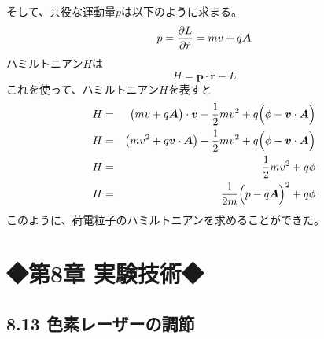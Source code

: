 \documentclass[11pt,a4paper]{jsarticle}
\begin{document}
そして、共役な運動量$p$は以下のように求まる。
\begin{equation}
  p = \frac{\partial L}{\partial \dot{r}} = mv + q \bm{A}\\
\end{equation}
ハミルトニアン$H$は
\begin{equation}
  H = \bm{p} \cdot \bm{\dot{r}} - L
\end{equation}
これを使って、ハミルトニアン$H$を表すと
\begin{eqnarray}
  H &=& \bigl( mv + q \bm{A} \bigr) \cdot \bm{v} - \frac{1}{2} m v^2 + q \Bigl( \phi - \bm{v} \cdot \bm{A} \Bigr)
  \\
  H &=& \bigl( mv^2 + q \bm{v} \cdot \bm{A} \bigr) - \frac{1}{2} m v^2 + q \Bigl( \phi - \bm{v} \cdot \bm{A} \Bigr)
  \\
  H &=& \frac{1}{2} m v^2 +  q \phi
  \\
  H &=& \frac{1}{2m} \Bigl( p - q \bm{A} \Bigr)^2 +  q \phi
\end{eqnarray}
このように、荷電粒子のハミルトニアンを求めることができた。



\section*{◆第8章 実験技術◆}
\subsection*{8.13 色素レーザーの調節}
\end{document}
